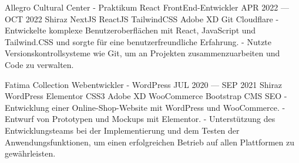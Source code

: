 

\begin{cventries}

\cventry
{Allegro Cultural Center - Praktikum} %
{React FrontEnd-Entwickler} %
{APR 2022 --- OCT 2022} %
{Shiraz} %
{
  NextJS \mitdiv ReactJS \mitdiv TailwindCSS \mitdiv Adobe XD \mitdiv Git \mitdiv Cloudflare
  \newline
  - Entwickelte komplexe Benutzeroberflächen mit React, JavaScript und Tailwind.CSS und sorgte für eine benutzerfreundliche Erfahrung.
  \newline
  - Nutzte Versionskontrollsysteme wie Git, um an Projekten zusammenzuarbeiten und Code zu verwalten.
}
% 

\cventry
{Fatima Collection} %
{Webentwickler - WordPress} %
{JUL 2020 --- SEP 2021} %
{Shiraz} %
{
  WordPress \mitdiv Elementor \mitdiv CSS3 \mitdiv Adobe XD \mitdiv WooCommerce \mitdiv Bootstrap \mitdiv CMS \mitdiv SEO
  \newline
  - Entwicklung einer Online-Shop-Website mit WordPress und WooCommerce.
  \newline
  - Entwurf von Prototypen und Mockups mit Elementor.
  \newline
  - Unterstützung des Entwicklungsteams bei der Implementierung und dem Testen der 
  Anwendungsfunktionen, um einen erfolgreichen Betrieb auf allen Plattformen zu gewährleisten.
}

\end{cventries}
